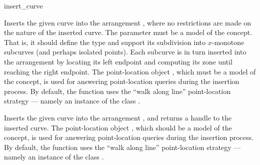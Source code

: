 \ccRefPageBegin

\begin{ccRefFunction}{insert_curve}

\ccDefinition

Inserts the given curve  into the arrangement , where
no restrictions are made on the nature of the inserted curve.
The  parameter must be a model of the
concept. That is, it should define the  type and support
its subdivision into $x$-monotone subcurves (and perhaps isolated points).
Each subcurve is in turn inserted into the arrangement by locating its
left endpoint and computing its zone until reaching the right endpoint.
The point-location object , which must be a model of the
 concept, is used for answering
point-location queries during the insertion process.
By default, the function uses the ``walk along line'' point-location
strategy --- namely an instance of the class
.



%

Inserts the given curve  into the arrangement , and returns
a handle to the inserted curve.
The point-location object , which should be a model of the
 concept, is used for answering
point-location queries during the insertion process.
By default, the function uses the ``walk along line'' point-location
strategy --- namely an instance of the class
.


\end{ccRefFunction}
